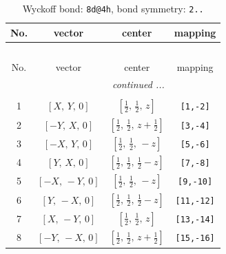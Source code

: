 \documentclass[fleqn,8pt]{jsarticle}
\begin{document}
\begin{longtable}{cccc}
\caption{Wyckoff bond: {\tt 8d@4h}, bond symmetry: {\tt 2..}}
 \\
 \hline \hline
No. & vector & center & mapping \\ \hline \endfirsthead

\multicolumn{3}{l}{\tablename\ \thetable{}} \\
 \hline \hline
No. & vector & center & mapping \\ \hline \endhead

 \hline \hline
\multicolumn{3}{r}{\footnotesize\it continued ...} \\ \endfoot

 \hline \hline
\multicolumn{3}{r}{} \\ \endlastfoot

1 & $\left[ X,\, Y,\, 0 \right]$ & $\left[ \frac{1}{2},\, \frac{1}{2},\, z \right]$ & {\tt [1,-2]} \\ \hline
2 & $\left[ - Y,\, X,\, 0 \right]$ & $\left[ \frac{1}{2},\, \frac{1}{2},\, z + \frac{1}{2} \right]$ & {\tt [3,-4]} \\ \hline
3 & $\left[ - X,\, Y,\, 0 \right]$ & $\left[ \frac{1}{2},\, \frac{1}{2},\, - z \right]$ & {\tt [5,-6]} \\ \hline
4 & $\left[ Y,\, X,\, 0 \right]$ & $\left[ \frac{1}{2},\, \frac{1}{2},\, \frac{1}{2} - z \right]$ & {\tt [7,-8]} \\ \hline
5 & $\left[ - X,\, - Y,\, 0 \right]$ & $\left[ \frac{1}{2},\, \frac{1}{2},\, - z \right]$ & {\tt [9,-10]} \\ \hline
6 & $\left[ Y,\, - X,\, 0 \right]$ & $\left[ \frac{1}{2},\, \frac{1}{2},\, \frac{1}{2} - z \right]$ & {\tt [11,-12]} \\ \hline
7 & $\left[ X,\, - Y,\, 0 \right]$ & $\left[ \frac{1}{2},\, \frac{1}{2},\, z \right]$ & {\tt [13,-14]} \\ \hline
8 & $\left[ - Y,\, - X,\, 0 \right]$ & $\left[ \frac{1}{2},\, \frac{1}{2},\, z + \frac{1}{2} \right]$ & {\tt [15,-16]} \\
\end{longtable}
\renewcommand{\arraystretch}{1.2}
\end{document}
